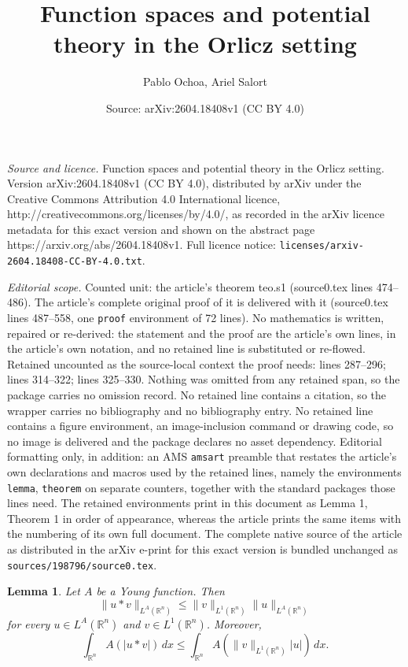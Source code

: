 \documentclass[10pt,a4paper]{amsart}
\title{Function spaces and potential theory in the Orlicz setting}
\author{Pablo Ochoa, Ariel Salort}
\date{Source: arXiv:2604.18408v1 (CC BY 4.0)}
\newtheorem{lemma}{Lemma}
\newcommand{\R}{\mathbb R}
\begin{document}
\maketitle

\noindent\emph{Source and licence.} Function spaces and potential theory in the Orlicz setting. Version arXiv:2604.18408v1 (CC BY 4.0), distributed by arXiv under the Creative Commons Attribution 4.0 International licence, http://creativecommons.org/licenses/by/4.0/, as recorded in the arXiv licence metadata for this exact version and shown on the abstract page https://arxiv.org/abs/2604.18408v1. Full licence notice: \texttt{licenses/arxiv-2604.18408-CC-BY-4.0.txt}.\par\smallskip

\noindent\textit{Editorial scope.} Counted unit: the article's theorem teo.s1 (source0.tex lines 474--486). The article's complete original proof of it is delivered with it (source0.tex lines 487--558, one \texttt{proof} environment of 72 lines). No mathematics is written, repaired or re-derived: the statement and the proof are the article's own lines, in the article's own notation, and no retained line is substituted or re-flowed.  Retained uncounted as the source-local context the proof needs: lines 287--296; lines 314--322; lines 325--330.  Nothing was omitted from any retained span, so the package carries no omission record.  No retained line contains a citation, so the wrapper carries no bibliography and no bibliography entry.  No retained line contains a figure environment, an image-inclusion command or drawing code, so no image is delivered and the package declares no asset dependency.  Editorial formatting only, in addition: an AMS \texttt{amsart} preamble that restates the article's own declarations and macros used by the retained lines, namely the environments \texttt{lemma}, \texttt{theorem} on separate counters, together with the standard packages those lines need.  The retained environments print in this document as Lemma 1, Theorem 1 in order of appearance, whereas the article prints the same items with the numbering of its own full document.  The complete native source of the article as distributed in the arXiv e-print for this exact version is bundled unchanged as \texttt{sources/198796/source0.tex}.
 \begin{lemma} \label{lema.1}
 Let $A$ be a Young function. Then
 $$
 \|u*v\|_{L^A(\R^n)} \leq \|v\|_{L^1(\R^n)}\|u\|_{L^A(\R^n)}
 $$
 for every $u\in L^A(\R^n)$ and $v\in L^1(\R^n)$. Moreover,
 $$
 \int_{\R^n}A(|u*v|)\,dx \leq\int_{\R^n} A\left(\|v\|_{L^1(\R^n)} |u|\right)\,dx.
 $$
 \end{lemma}
\end{document}

